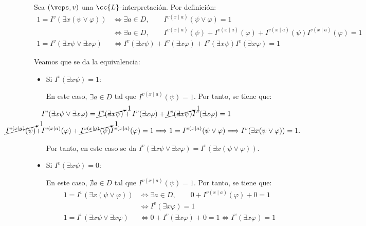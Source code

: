 \begin{ejercicio}
\begin{enumerate}
        Sea $(\veps,v)$ una $\cc{L}$-interpretación. Por definición:
        \begin{align*}
            1 = I^v(\exists x(\psi \vee \varphi))
            &\iff \exists a\in D,\qquad I^{v(x\mid a)}(\psi \vee \varphi) = 1\\
            &\iff \exists a\in D,\qquad I^{v(x\mid a)}(\psi) + I^{v(x\mid a)}(\varphi) + I^{v(x\mid a)}(\psi)I^{v(x\mid a)}(\varphi) = 1\\
            1 = I^v(\exists x \psi \vee \exists x \varphi)
            &\iff I^v(\exists x \psi) + I^v(\exists x \varphi) + I^v(\exists x \psi)I^v(\exists x \varphi) = 1
        \end{align*}

        Veamos que se da la equivalencia:
        \begin{itemize}
            \item Si $I^v(\exists x \psi)=1$:
            
            En este caso, $\exists a\in D$ tal que $I^{v(x\mid a)}(\psi) = 1$. Por tanto, se tiene que:
            \begin{align*}
                \hspace{-2cm}&I^v(\exists x \psi \vee \exists x \varphi) = \cancelto{1}{I^v(\exists x \psi)} + I^v(\exists x \varphi) + \cancelto{1}{I^v(\exists x \psi)}I^v(\exists x \varphi) = 1\\
                \hspace{-2cm}\cancelto{1}{I^{v(x\mid a)}(\psi)} +& I^{v(x\mid a)}(\varphi) + \cancelto{1}{I^{v(x\mid a)}(\psi)}I^{v(x\mid a)}(\varphi)=1
                \Longrightarrow 1 = I^{v(x\mid a)}(\psi \vee \varphi)
                \Longrightarrow I^v(\exists x(\psi \vee \varphi)) = 1.
            \end{align*}

            Por tanto, en este caso se da $I^v(\exists x \psi \vee \exists x \varphi) = I^v(\exists x(\psi \vee \varphi))$.

            \item Si $I^v(\exists x \psi)=0$:
            
            En este caso, $\nexists a\in D$ tal que $I^{v(x\mid a)}(\psi) = 1$. Por tanto, se tiene que:
            \begin{align*}
                1 = I^v(\exists x(\psi \vee \varphi))
                &\iff \exists a\in D,\qquad 0+ I^{v(x\mid a)}(\varphi) + 0 = 1\\
                &\iff I^v(\exists x \varphi) = 1\\
                1 = I^v(\exists x \psi \vee \exists x \varphi)
                &\iff 0 + I^v(\exists x \varphi) + 0 = 1\iff I^v(\exists x \varphi) = 1
            \end{align*}


\end{itemize}
\end{enumerate}
\end{ejercicio}
